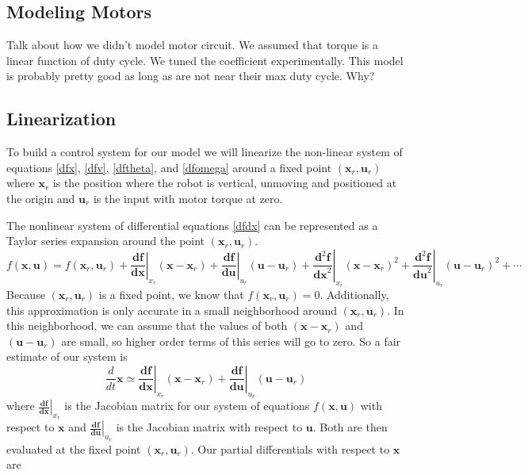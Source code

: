 \documentclass[]{article}
\newcommand{\bx}{\boldsymbol{x}}
\newcommand{\bu}{\boldsymbol{u}}
\begin{document}
\subsection*{Modeling Motors}
Talk about how we didn't model motor circuit. We assumed that torque is a linear function of duty cycle.  We tuned the coefficient experimentally.  This model is probably pretty good as long as are not near their max duty cycle. Why?

\subsection*{Linearization}
To build a control system for our model we will linearize the non-linear system of equations \eqref{dfx}, \eqref{dfv}, \eqref{dftheta}, and \eqref{dfomega} around a fixed point $(\bx_r, \bu_r)$  where $\bx_r$ is the position where the robot is vertical, unmoving and positioned at the origin and $\bu_r$ is the input with motor torque at zero.

The nonlinear system of differential equations \eqref{dfdx} can be represented as a Taylor series expansion around the point $(\bx_r, \bu_r)$.
\begin{equation}
	 f(\bx, \bu) = f(\bx_r, \bu_r) + \left.  \frac{\boldsymbol{df}}{\boldsymbol{dx}} \right|_{x_r}(\bx -\bx_r) 
	 + \left.  \frac{\boldsymbol{df}}{\boldsymbol{du}} \right|_{u_r}(\bu -\bu_r) 
	 + \left. \frac{\boldsymbol{d}^2\boldsymbol{f}}{\boldsymbol{dx}^2} \right|_{x_r}(\bx -\bx_r)^2
	 + \left. \frac{\boldsymbol{d}^2\boldsymbol{f}}{\boldsymbol{du}^2} \right|_{u_r}(\bu -\bu_r)^2 + \cdots
\end{equation}
Because $(\bx_r, \bu_r)$ is a fixed point, we know that $f(\bx_r, \bu_r) = 0$. Additionally, this approximation is only accurate in a small neighborhood around $(\bx_r, \bu_r)$.  In this neighborhood, we can assume that the values of both $(\bx -\bx_r)$ and $(\bu -\bu_r)$ are small, so higher order terms of this series will go to zero. So a fair estimate of our system is
\begin{equation}
	\frac{d}{dt} \bx \simeq \left.  \frac{\boldsymbol{df}}{\boldsymbol{dx}} \right|_{x_r}(\bx -\bx_r) 
	+  \left.  \frac{\boldsymbol{df}}{\boldsymbol{du}} \right|_{u_r}(\bu -\bu_r) 
\end{equation}
where $\left.  \frac{\boldsymbol{df}}{\boldsymbol{dx}} \right|_{x_r}$ is the Jacobian matrix for our system of equations $f(\bx, \bu)$ with respect to $\bx$ and $\left.  \frac{\boldsymbol{df}}{\boldsymbol{du}} \right|_{u_r}$ is the Jacobian matrix with respect to $\bu$. Both are then evaluated at the fixed point $(\bx_r, \bu_r)$.  Our partial differentials with respect to $\bx$ are
\end{document}
